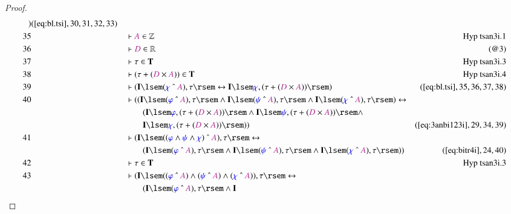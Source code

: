 \begin{proof}
\begin{align}
      )&(\mbox{\ref{eq:bl.tsi}},30,31,32,33)\notag
  \\ 35 &&  & \vdash \mc{A} \in
      \mathbb{Z}&\text{Hyp~tsan3i.1}\notag%
  \\ 36 &&  & \vdash \mc{D} \in \mathbb{R}&(@3)\notag
  \\ 37 &&  & \vdash \tau \in \mathbf{T}&\text{Hyp~tsan3i.3}\notag%
  \\ 38 &&  & \vdash ( \tau + ( \mc{D} \times \mc{A} ) ) \in
      \mathbf{T}&\text{Hyp~tsan3i.4}\notag%
  \\ 39 &&  & \vdash ( \mathbf{I} \lsem ( \mw{\chi} ~\string^~ \mc{A} ) , \tau
      \rsem \leftrightarrow \mathbf{I} \lsem \mw{\chi} , (
      \tau + ( \mc{D} \times \mc{A} ) ) \rsem
      )&(\mbox{\ref{eq:bl.tsi}},35,36,37,38)\notag
  \\ 40 &&  & \vdash ( ( \mathbf{I} \lsem ( \mw{\varphi} ~\string^~ \mc{A} ) ,
      \tau \rsem \wedge \mathbf{I} \lsem ( \mw{\psi}
      ~\string^~ \mc{A} ) , \tau \rsem \wedge \mathbf{I}
      \lsem ( \mw{\chi} ~\string^~ \mc{A} ) , \tau \rsem )
      \leftrightarrow  \notag \\ & & & \qquad
     ( \mathbf{I} \lsem \mw{\varphi} , (
      \tau + ( \mc{D} \times \mc{A} ) ) \rsem \wedge
      \mathbf{I} \lsem \mw{\psi} , ( \tau + ( \mc{D} \times
      \mc{A} ) ) \rsem \wedge \notag \\ & & & \qquad
      \mathbf{I} \lsem \mw{\chi} ,
      ( \tau + ( \mc{D} \times \mc{A} ) ) \rsem )
      )&(\mbox{\ref{eq:3anbi123i}},29,34,39)\notag
  \\ 41 &&  & \vdash ( \mathbf{I} \lsem ( ( \mw{\varphi} \wedge \mw{\psi}
      \wedge \mw{\chi} ) ~\string^~ \mc{A} ) , \tau \rsem
      \leftrightarrow  \notag \\ & & & \qquad
     ( \mathbf{I} \lsem ( \mw{\varphi}
      ~\string^~ \mc{A} ) , \tau \rsem \wedge \mathbf{I}
      \lsem ( \mw{\psi} ~\string^~ \mc{A} ) , \tau \rsem
      \wedge \mathbf{I} \lsem ( \mw{\chi} ~\string^~ \mc{A}
      ) , \tau \rsem )
      )&(\mbox{\ref{eq:bitr4i}},24,40)\notag
  \\ 42 &&  & \vdash \tau \in \mathbf{T}&\text{Hyp~tsan3i.3}\notag%
  \\ 43 &&  & \vdash ( \mathbf{I} \lsem ( ( \mw{\varphi} ~\string^~ \mc{A} )
      \wedge ( \mw{\psi} ~\string^~ \mc{A} ) \wedge (
      \mw{\chi} ~\string^~ \mc{A} ) ) , \tau \rsem
      \leftrightarrow  \notag \\ & & & \qquad
     ( \mathbf{I} \lsem ( \mw{\varphi}
      ~\string^~ \mc{A} ) , \tau \rsem \wedge \mathbf{I}

\end{align}
\end{proof}
